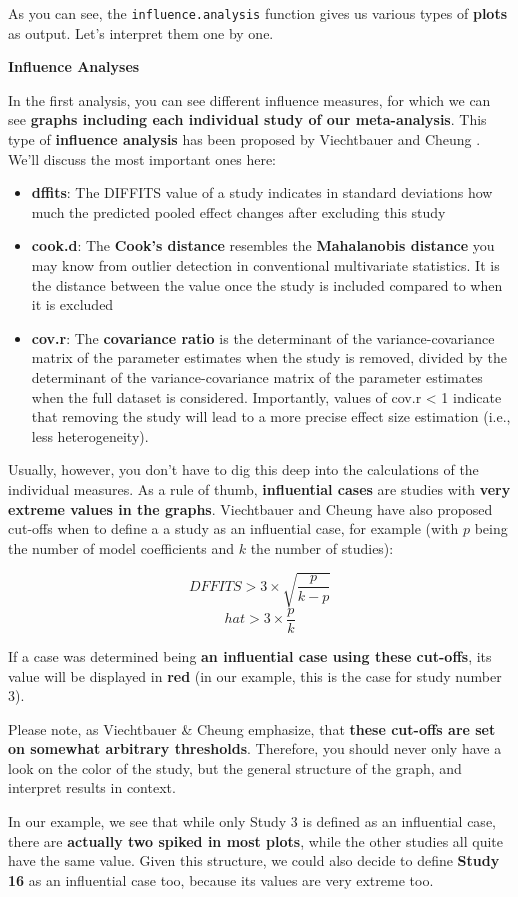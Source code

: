 \documentclass[]{book}
\providecommand{\tightlist}{%
  \setlength{\itemsep}{0pt}\setlength{\parskip}{0pt}}
\begin{document}
As you can see, the \texttt{influence.analysis} function gives us various types of \textbf{plots} as output. Let's interpret them one by one.

\textbf{Influence Analyses}

In the first analysis, you can see different influence measures, for which we can see \textbf{graphs including each individual study of our meta-analysis}. This type of \textbf{influence analysis} has been proposed by Viechtbauer and Cheung \citep{viechtbauer2010outlier}. We'll discuss the most important ones here:

\begin{itemize}
\tightlist
\item
  \textbf{dffits}: The DIFFITS value of a study indicates in standard deviations how much the predicted pooled effect changes after excluding this study
\item
  \textbf{cook.d}: The \textbf{Cook's distance} resembles the \textbf{Mahalanobis distance} you may know from outlier detection in conventional multivariate statistics. It is the distance between the value once the study is included compared to when it is excluded
\item
  \textbf{cov.r}: The \textbf{covariance ratio} is the determinant of the variance-covariance matrix of the parameter estimates when the study is removed, divided by the determinant of the variance-covariance matrix of the parameter estimates when the full dataset is considered. Importantly, values of cov.r \textless{} 1 indicate that removing the study will lead to a more precise effect size estimation (i.e., less heterogeneity).
\end{itemize}

Usually, however, you don't have to dig this deep into the calculations of the individual measures. As a rule of thumb, \textbf{influential cases} are studies with \textbf{very extreme values in the graphs}. Viechtbauer and Cheung have also proposed cut-offs when to define a a study as an influential case, for example (with \(p\) being the number of model coefficients and \(k\) the number of studies):

\[ DFFITS > 3\times\sqrt{\frac{p}{k-p}}\]
\[ hat > 3\times\frac{p}{k}\]

If a case was determined being \textbf{an influential case using these cut-offs}, its value will be displayed in \textbf{red} (in our example, this is the case for study number 3).

\begin{rmdachtung}
Please note, as Viechtbauer \& Cheung emphasize, that \textbf{these
cut-offs are set on somewhat arbitrary thresholds}. Therefore, you
should never only have a look on the color of the study, but the general
structure of the graph, and interpret results in context.

In our example, we see that while only Study 3 is defined as an
influential case, there are \textbf{actually two spiked in most plots},
while the other studies all quite have the same value. Given this
structure, we could also decide to define \textbf{Study 16} as an
influential case too, because its values are very extreme too.
\end{rmdachtung}
\end{document}
